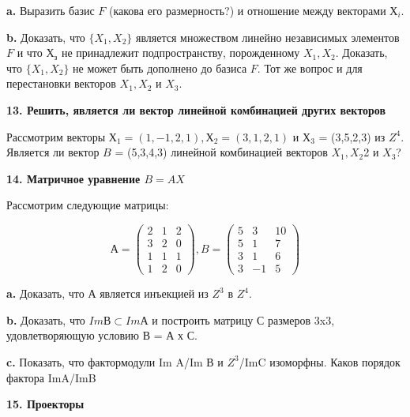 \documentclass{../template/mai_book}
\begin{document}
\medskip

{\bf a.} Выразить базис $ F$ (какова его размерность?) и отношение между 
векторами $Х_i$. 

\medskip

{\bf b.} Доказать, что $\{X_1,X_2\}$ является множеством линейно 
независимых элементов $F$ и что $Х_з$ не принадлежит подпространству, 
порожденному $X_1,X_2$. Доказать, что $\{X_1,X_2\}$ не может быть дополнено до 
базиса $F$. Тот же вопрос и для перестановки векторов $X_1,X_2$ и $X_3$. 

\medskip

{\noindent\bf13. Решить, является ли вектор линейной комбинацией 
других векторов}

\medskip

Рассмотрим векторы $Х_1 = (1,-1,2,1), Х_2 = (3,1,2,1)$ и 
$Х_3$ = (3,5,2,3) из $\mathit{Z}^4$. Является ли вектор $B$ = (5,3,4,3) линейной 
комбинацией векторов $X_1,X_2$2 и $X_3$? 

\medskip

{\noindent\bf14. Матричное уравнение $B = AX$}

\medskip

Рассмотрим следующие матрицы: 


$$А =\begin{pmatrix}
2 & 1 & 2 \\
3 & 2 & 0 \\
1 & 1 & 1 \\
1 & 2 & 0 
\end{pmatrix},
B =\begin{pmatrix}
5 & 3 & 10 \\
5 & 1 & 7 \\
3 & 1 & 6 \\
3 & -1 & 5 
\end{pmatrix}$$

\medskip

{\bf a.} Доказать, что А является инъекцией из $\mathit{Z}^3$ в $\mathit{Z}^4$. 

\medskip

{\bf b.} Доказать, что $ImВ \subset ImА$ и построить матрицу С размеров 
3x3, удовлетворяющую условию В = А х С. 

\medskip

{\bf c.} Показать, что фактормодули Im A/Im В и $\mathit{Z}^3$/ImC изоморфны. 
Каков порядок фактора ImA/ImB

\pagebreak

{\noindent\bf 15. Проекторы}

\medskip
\end{document}
